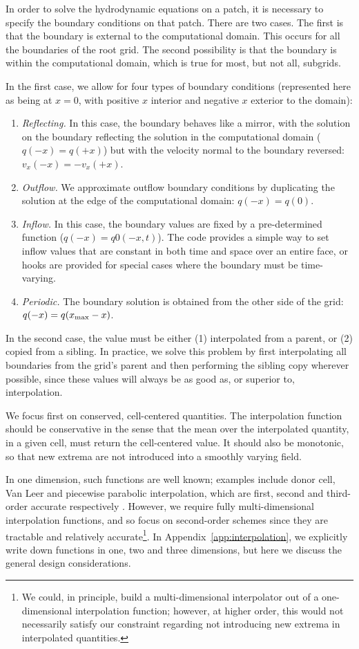 In order to solve the hydrodynamic equations on a patch, it is necessary to specify the boundary conditions on that patch.  There are two cases.  The first is that the boundary is external to the computational domain.  This occurs for all the boundaries of the root grid.  The second possibility is that the boundary is within the computational domain, which is true for most, but not all, subgrids.

In the first case, we allow for four types of boundary conditions
(represented here as being at $x=0$, with positive $x$ interior and
negative $x$ exterior to the domain):
\begin{enumerate}
  \item{\em Reflecting.} In this case, the boundary behaves like a mirror, with the solution on the boundary reflecting the solution in the computational domain ($q(-x) = q(+x)$) but with the velocity normal to the boundary reversed: $v_x(-x) = -v_x(+x)$.
  \item{\em Outflow.}  We approximate outflow boundary conditions by duplicating the solution at the edge of the computational domain: $q(-x) = q(0)$.
  \item{\em Inflow.} In this case, the boundary values are fixed by a pre-determined function ($q(-x) = q0(-x,t)$).  The code provides a simple way to set inflow values that are constant in both time and space over an entire face, or hooks are provided for special cases where the boundary must be time-varying.
  \item{\em Periodic.} The boundary solution is obtained from the other side of the grid: $q(-x) = q(x_{\rm{max}}-x)$.
\end{enumerate}

In the second case, the value must be either (1) interpolated from a parent, or (2) copied from a sibling.  In practice, we solve this problem by first interpolating all boundaries from the grid's parent and then performing the sibling copy wherever possible, since these values will always be as good as, or superior to, interpolation.

We focus first on conserved, cell-centered quantities.  The interpolation function should be conservative in the sense that the mean over the interpolated quantity, in a given cell, must return the cell-centered value.  It should also be monotonic, so that new extrema are not introduced into a smoothly varying field.

In one dimension, such functions are well known; examples include
donor cell, Van Leer and piecewise parabolic interpolation, which are
first, second and third-order accurate respectively
\citep[e.g.,][]{Stone92a}.  However, we require fully
multi-dimensional interpolation functions, and so focus on
second-order schemes since they are tractable and relatively 
accurate\footnote{We could, in principle, build a multi-dimensional
  interpolator out of a one-dimensional interpolation function;
  however, at higher order, this would not necessarily satisfy our
  constraint regarding not introducing new extrema in interpolated quantities.}.  In Appendix~\ref{app:interpolation}, we
explicitly write down functions in one, two and three dimensions, but
here we discuss the general design considerations.

